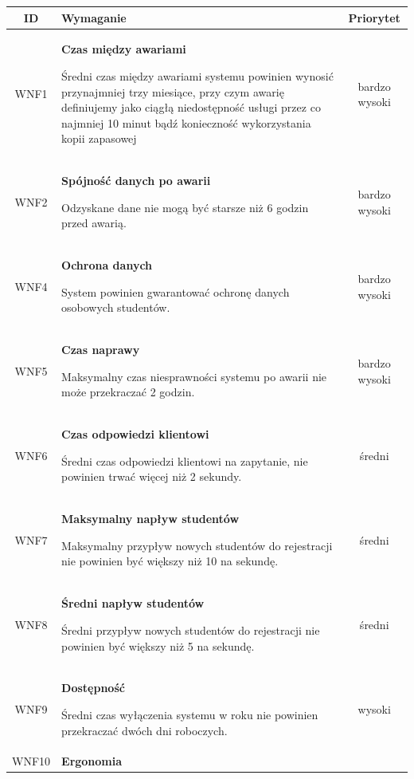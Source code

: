 \begin{tabularx}{\textwidth}{|c|X|c|}
\hline
\textbf{ID} & \textbf{Wymaganie}  & \textbf{Priorytet} \\
\hline

\label{z:WNF1} WNF1 & \textbf{Czas między awariami} 
 
Średni czas między awariami systemu powinien wynosić przynajmniej trzy miesiące, przy czym awarię definiujemy jako ciągłą niedostępność usługi przez co najmniej 10 minut bądź konieczność wykorzystania kopii zapasowej
 & bardzo wysoki\\
\hline

\label{z:WNF2} WNF2 & \textbf{Spójność danych po awarii} 
 
Odzyskane dane nie mogą być starsze niż 6 godzin przed awarią.
 & bardzo wysoki\\
\hline

\label{z:WNF4} WNF4 & \textbf{Ochrona danych} 
 
System powinien gwarantować ochronę danych osobowych studentów.
 & bardzo wysoki\\
\hline

\label{z:WNF5} WNF5 & \textbf{Czas naprawy} 
 
Maksymalny czas niesprawności systemu po awarii nie może przekraczać 2 godzin.
 & bardzo wysoki\\
\hline

\label{z:WNF6} WNF6 & \textbf{Czas odpowiedzi klientowi} 
 
Średni czas odpowiedzi klientowi na zapytanie, nie powinien trwać więcej niż  2 sekundy.
 & średni\\
\hline

\label{z:WNF7} WNF7 & \textbf{Maksymalny napływ studentów} 
 
Maksymalny przypływ nowych studentów do rejestracji nie powinien być większy niż 10 na sekundę.
 & średni\\
\hline

\label{z:WNF8} WNF8 & \textbf{Średni napływ studentów} 
 
Średni przypływ nowych studentów do rejestracji nie powinien być większy niż 5 na sekundę.
 & średni\\
\hline

\label{z:WNF9} WNF9 & \textbf{Dostępność} 
 
Średni czas wyłączenia systemu w roku nie powinien przekraczać dwóch dni roboczych.
 & wysoki\\
\hline

\label{z:WNF10} WNF10 & \textbf{Ergonomia} 
 

\end{tabularx}
